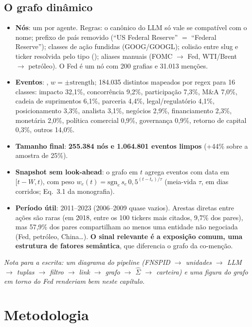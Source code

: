 \documentclass[11pt,a4paper]{article}
\newcommand{\Sig}{\hat\Sigma}
\newcommand{\nota}[1]{\textcolor{blue!60!black}{\textit{Nota para a escrita: #1}}}
\begin{document}
\subsection{O grafo dinâmico}

\begin{itemize}
  \item \textbf{Nós}: um por agente. Regras: o canônico do LLM só vale se compatível com o nome; prefixo de
        país removido (``US Federal Reserve'' $=$ ``Federal Reserve''); classes de ação fundidas
        (GOOG/GOOGL); colisão entre slug e ticker resolvida pelo tipo ();
        aliases manuais (FOMC $\to$ Fed, WTI/Brent $\to$ petróleo). O Fed é um nó com 200 grafias e 31.013 menções.
  \item \textbf{Eventos}: , $w=\pm\text{strength}$; 184.035 
        distintos mapeados por regex para 16 classes: impacto 32,1\%, concorrência 9,2\%, participação
        7,3\%, M\&A 7,0\%, cadeia de suprimentos 6,1\%, parceria 4,4\%, legal/regulatório 4,1\%,
        posicionamento 3,3\%, analista 3,1\%, negócios 2,9\%, financiamento 2,3\%, monetária 2,0\%,
        política comercial 0,9\%, governança 0,9\%, retorno de capital 0,3\%, outros 14,0\%.
  \item \textbf{Tamanho final}: \textbf{255.384 nós e 1.064.801 eventos limpos} (+44\% sobre a amostra de 25\%).
  \item \textbf{Snapshot sem look-ahead}: o grafo em $t$ agrega eventos com data em $[t-W,t)$, com peso
        $w_e(t)=\mathrm{sgn}_e\,s_e\,0{,}5^{(t-t_e)/\tau}$ (meia-vida $\tau$, em dias corridos; Eq.~3.1 da monografia).
  \item \textbf{Período útil}: 2011--2023 (2006--2009 quase vazios). Arestas diretas entre ações são raras
        (em 2018, entre os 100 tickers mais citados, 9,7\% dos pares), mas 57,9\% dos pares compartilham
        ao menos uma entidade não negociada (Fed, petróleo, China\ldots). \textbf{O sinal relevante é a
        exposição comum, uma estrutura de fatores semântica}, que diferencia o grafo da co-menção.
\end{itemize}

\nota{um diagrama do pipeline (FNSPID $\to$ unidades $\to$ LLM $\to$ tuplas $\to$ filtro $\to$ link $\to$
grafo $\to$ $\Sig$ $\to$ carteira) e uma figura do grafo em torno do Fed renderiam bem neste capítulo.}

\section{Metodologia}\label{sec:metodo}
\end{document}
